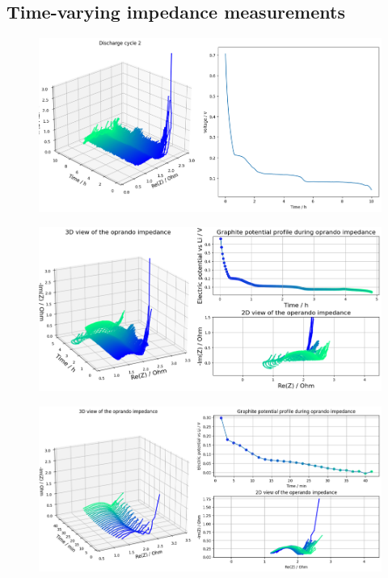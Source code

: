 \subsection{Time-varying impedance measurements}

\begin{figure}[h]
    \centering
    \includegraphics[width=\linewidth]{figures/application5/image1.png}
\end{figure}

\begin{figure}[h]
    \centering
    \includegraphics[width=\linewidth]{figures/application5/image2.png}
\end{figure}

\begin{figure}[h]
    \centering
    \includegraphics[width=\linewidth]{figures/application5/image3.png}
\end{figure}


